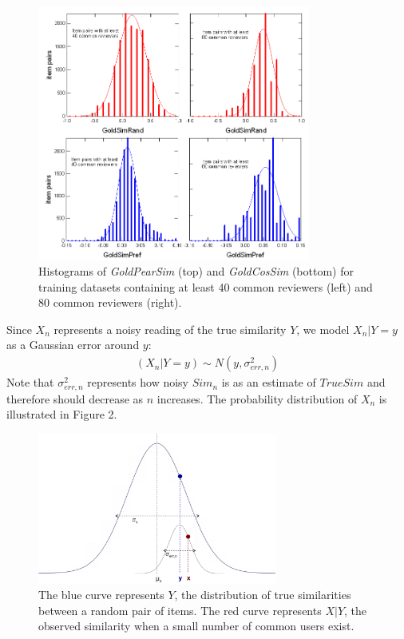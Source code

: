 \documentclass[11pt]{article}
\begin{document}
\begin{figure}[!htbp]
    \centering
    \includegraphics[width=0.8\textwidth]{Histograms.png}
	\caption{Histograms of {\em GoldPearSim} (top) and {\em GoldCosSim}
(bottom) for training datasets containing at least 40 common reviewers (left)
and 80 common reviewers (right).}
    \label{fig:Histograms}
\end{figure}


Since $X_n$ represents
a noisy reading of the true similarity $Y$, we model $X_n | Y=y$ as a Gaussian
error around $y$:
\begin{align}
(X_n | Y=y) \sim N(y, \sigma_{err, n}^2)
\end{align}
Note that $\sigma_{err, n}^2$ represents how noisy $Sim_n$ is as an estimate of
$TrueSim$ and therefore should decrease as $n$ increases. The probability
distribution of $X_n$ is illustrated in Figure 2.

\begin{figure}[!htbp]
    \centering
    \includegraphics[width=0.7\textwidth]{twonormals.png}
	\caption{The blue curve represents $Y$, the distribution of true
    similarities between a random pair of items. The red curve represents $X|Y$,
    the observed similarity when a small number of common users exist.}
    \label{fig:two_normals}
\end{figure}
\end{document}
